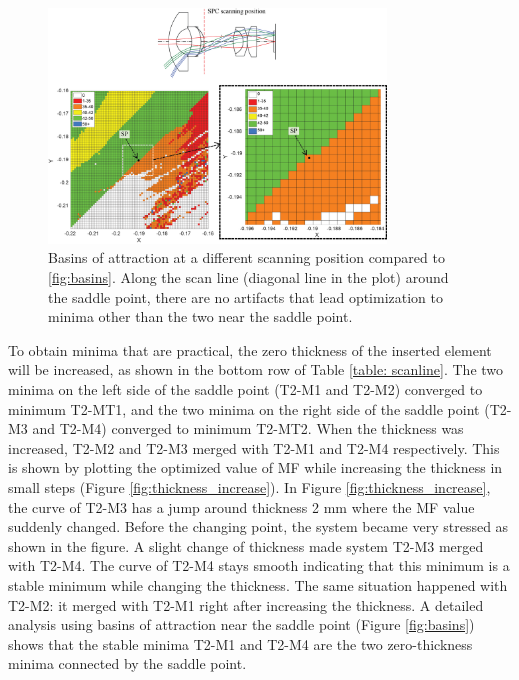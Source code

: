 \begin{figure}[h!]
    \centering
    \includegraphics[width=0.8\textwidth]{chapter-4/figures/M3-S5_basins.png}
    \caption{Basins of attraction at a different scanning position compared to \ref{fig:basins}. Along the scan line (diagonal line in the plot) around the saddle point, there are no artifacts that lead optimization to minima other than the two near the saddle point.}
    \label{fig:basins_WAL_M3_S5}
\end{figure}
To obtain minima that are practical, the zero thickness of the inserted element will be increased, as shown in the bottom row of Table \ref{table: scanline}. The two minima on the left side of the saddle point (T2-M1 and T2-M2) converged to minimum T2-MT1, and the two minima on the right side of the saddle point (T2-M3 and T2-M4) converged to minimum T2-MT2. When the thickness was increased, T2-M2 and T2-M3 merged with T2-M1 and T2-M4 respectively. This is shown by plotting the optimized value of MF while increasing the thickness in small steps (Figure \ref{fig:thickness_increase}). In Figure \ref{fig:thickness_increase}, the curve of T2-M3 has a jump around thickness 2 mm where the MF value suddenly changed. Before the changing point, the system became very stressed as shown in the figure. A slight change of thickness made system T2-M3 merged with T2-M4. The curve of T2-M4 stays smooth indicating that this minimum is a stable minimum while changing the thickness. The same situation happened with T2-M2: it merged with T2-M1 right after increasing the thickness. A detailed analysis using basins of attraction near the saddle point (Figure \ref{fig:basins}) shows that the stable minima T2-M1 and T2-M4 are the two zero-thickness minima connected by the saddle point.
